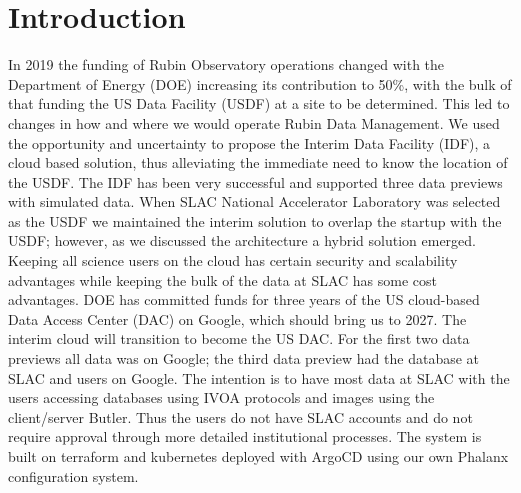\section{Introduction}
In 2019 the funding of Rubin Observatory operations changed with the Department of Energy (DOE) increasing its contribution to 50\%, with the bulk of that funding the US Data Facility (USDF) at a site to be determined.
This led to changes in how and where we would operate Rubin Data Management.
We used the opportunity and uncertainty to propose the Interim Data Facility (IDF), a cloud based solution, thus alleviating the immediate need to know the location of the USDF.
The IDF has been very successful and supported three data previews with simulated data.
When SLAC National Accelerator Laboratory was selected as the USDF we maintained the interim solution to overlap the startup with the USDF; however, as we discussed the architecture a hybrid solution emerged.
Keeping all science users on the cloud has certain security and scalability advantages while keeping the bulk of the data at SLAC has some cost advantages.
DOE has committed funds for three years of the US cloud-based Data Access Center (DAC) on Google, which should bring us to 2027.
The interim cloud will transition to become the US DAC.
For the first two data previews all data was on Google; the third data preview had the database at SLAC and users on Google.
The intention is to have most data at SLAC with the users accessing databases using IVOA protocols and images using the client/server Butler.
Thus the users do not have SLAC accounts and do not require approval through more detailed institutional processes.
The system is built on terraform and kubernetes deployed with ArgoCD using our own Phalanx configuration system.











